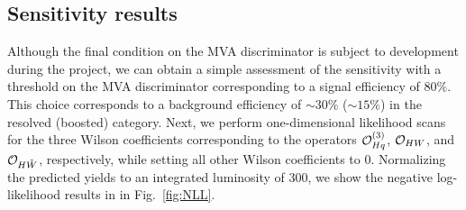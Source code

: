 \documentclass[a4paper,11pt]{article}
\begin{document}
\subsection{Sensitivity results}

Although the final condition on the MVA discriminator is subject to development during the project, 
we can obtain a simple assessment of the sensitivity with a threshold on the MVA discriminator corresponding to a signal efficiency of $80\%$.
This choice corresponds to a background efficiency of $\sim 30\%$ ($\sim 15\%$) in the resolved (boosted) category.
Next, we perform one-dimensional likelihood scans for the three Wilson coefficients corresponding to the operators ${\cal O}^{(3)}_{Hq}$, ${\cal O}_{HW}$, and ${\cal O}_{H\tilde{W}}$, respectively, while setting all other Wilson coefficients to $0$. 
Normalizing the predicted yields to an integrated luminosity of 300\fbinv, we show the negative log-likelihood results in in Fig.~\ref{fig:NLL}. %
\end{document}

